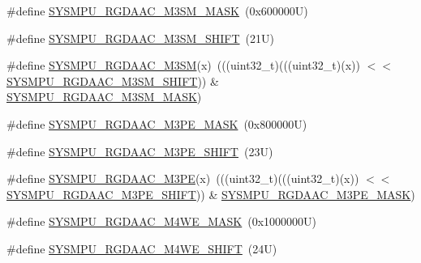 \begin{DoxyCompactItemize}
\item 
\#define \mbox{\hyperlink{group___s_y_s_m_p_u___register___masks_gad141d56f495c594e278315708d6e350c}{S\+Y\+S\+M\+P\+U\+\_\+\+R\+G\+D\+A\+A\+C\+\_\+\+M3\+S\+M\+\_\+\+M\+A\+SK}}~(0x600000\+U)
\item 
\#define \mbox{\hyperlink{group___s_y_s_m_p_u___register___masks_ga89b50e242d50fb28a55a09c66859f66b}{S\+Y\+S\+M\+P\+U\+\_\+\+R\+G\+D\+A\+A\+C\+\_\+\+M3\+S\+M\+\_\+\+S\+H\+I\+FT}}~(21\+U)
\item 
\#define \mbox{\hyperlink{group___s_y_s_m_p_u___register___masks_gaee6e6e15b28b1a812fa522b3fb08d54b}{S\+Y\+S\+M\+P\+U\+\_\+\+R\+G\+D\+A\+A\+C\+\_\+\+M3\+SM}}(x)~(((uint32\+\_\+t)(((uint32\+\_\+t)(x)) $<$$<$ \mbox{\hyperlink{group___s_y_s_m_p_u___register___masks_ga89b50e242d50fb28a55a09c66859f66b}{S\+Y\+S\+M\+P\+U\+\_\+\+R\+G\+D\+A\+A\+C\+\_\+\+M3\+S\+M\+\_\+\+S\+H\+I\+FT}})) \& \mbox{\hyperlink{group___s_y_s_m_p_u___register___masks_gad141d56f495c594e278315708d6e350c}{S\+Y\+S\+M\+P\+U\+\_\+\+R\+G\+D\+A\+A\+C\+\_\+\+M3\+S\+M\+\_\+\+M\+A\+SK}})
\item 
\#define \mbox{\hyperlink{group___s_y_s_m_p_u___register___masks_gaa1de9ddeb982fc776df6bdecda7cecf2}{S\+Y\+S\+M\+P\+U\+\_\+\+R\+G\+D\+A\+A\+C\+\_\+\+M3\+P\+E\+\_\+\+M\+A\+SK}}~(0x800000\+U)
\item 
\#define \mbox{\hyperlink{group___s_y_s_m_p_u___register___masks_ga499c52fd154f96f23c8790846de1b347}{S\+Y\+S\+M\+P\+U\+\_\+\+R\+G\+D\+A\+A\+C\+\_\+\+M3\+P\+E\+\_\+\+S\+H\+I\+FT}}~(23\+U)
\item 
\#define \mbox{\hyperlink{group___s_y_s_m_p_u___register___masks_ga79f9e4bac84523a253a2a7857892c69e}{S\+Y\+S\+M\+P\+U\+\_\+\+R\+G\+D\+A\+A\+C\+\_\+\+M3\+PE}}(x)~(((uint32\+\_\+t)(((uint32\+\_\+t)(x)) $<$$<$ \mbox{\hyperlink{group___s_y_s_m_p_u___register___masks_ga499c52fd154f96f23c8790846de1b347}{S\+Y\+S\+M\+P\+U\+\_\+\+R\+G\+D\+A\+A\+C\+\_\+\+M3\+P\+E\+\_\+\+S\+H\+I\+FT}})) \& \mbox{\hyperlink{group___s_y_s_m_p_u___register___masks_gaa1de9ddeb982fc776df6bdecda7cecf2}{S\+Y\+S\+M\+P\+U\+\_\+\+R\+G\+D\+A\+A\+C\+\_\+\+M3\+P\+E\+\_\+\+M\+A\+SK}})
\item 
\#define \mbox{\hyperlink{group___s_y_s_m_p_u___register___masks_gabb5f7c93ab93b88d2a8480f2ca8d8b92}{S\+Y\+S\+M\+P\+U\+\_\+\+R\+G\+D\+A\+A\+C\+\_\+\+M4\+W\+E\+\_\+\+M\+A\+SK}}~(0x1000000\+U)
\item 
\#define \mbox{\hyperlink{group___s_y_s_m_p_u___register___masks_ga0fa0186c2648eb2d8c7eded2a95a603e}{S\+Y\+S\+M\+P\+U\+\_\+\+R\+G\+D\+A\+A\+C\+\_\+\+M4\+W\+E\+\_\+\+S\+H\+I\+FT}}~(24\+U)

\end{DoxyCompactItemize}
